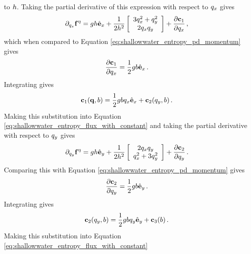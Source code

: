 to $h$.  Taking the partial derivative of this expression with respect to
$q_x$ gives
\begin{equation}
  \partial_{q_x}\mathbf{f}^\eta
  = gh\hat{\mathbf{e}}_x
  + \frac{1}{2h^2}\left[\begin{array}{c}
      3q_x^2 + q_y^2\\
      2q_xq_y\\
    \end{array}\right]
  + \frac{\partial \mathbf{c}_1}{\partial q_x}
  \,,
\end{equation}
which when compared to Equation \eqref{eq:shallowwater_entropy_pd_momentum}
gives
\begin{equation}
  \frac{\partial \mathbf{c}_1}{\partial q_x}
  = \frac{1}{2}gb\hat{\mathbf{e}}_x
  \,.
\end{equation}
Integrating gives
\begin{equation}
  \mathbf{c}_1(\mathbf{q},b)
  = \frac{1}{2}gbq_x\hat{\mathbf{e}}_x
  + \mathbf{c}_2(q_y,b)
  \,.
\end{equation}
Making this substitution into Equation
\eqref{eq:shallowwater_entropy_flux_with_constant}
and taking the partial derivative with respect to $q_y$
gives
\begin{equation}
  \partial_{q_y}\mathbf{f}^\eta
  = gh\hat{\mathbf{e}}_y
  + \frac{1}{2h^2}\left[\begin{array}{c}
      2q_xq_y\\
      q_x^2 + 3q_y^2\\
    \end{array}\right]
  + \frac{\partial \mathbf{c}_2}{\partial q_y}
  \,.
\end{equation}
Comparing this with Equation \eqref{eq:shallowwater_entropy_pd_momentum}
gives
\begin{equation}
  \frac{\partial \mathbf{c}_2}{\partial q_y}
  = \frac{1}{2}gb\hat{\mathbf{e}}_y
  \,.
\end{equation}
Integrating gives
\begin{equation}
  \mathbf{c}_2(q_y,b)
  = \frac{1}{2}gbq_y\hat{\mathbf{e}}_y
  + \mathbf{c}_3(b)
  \,.
\end{equation}
Making this substitution into Equation
\eqref{eq:shallowwater_entropy_flux_with_constant}
